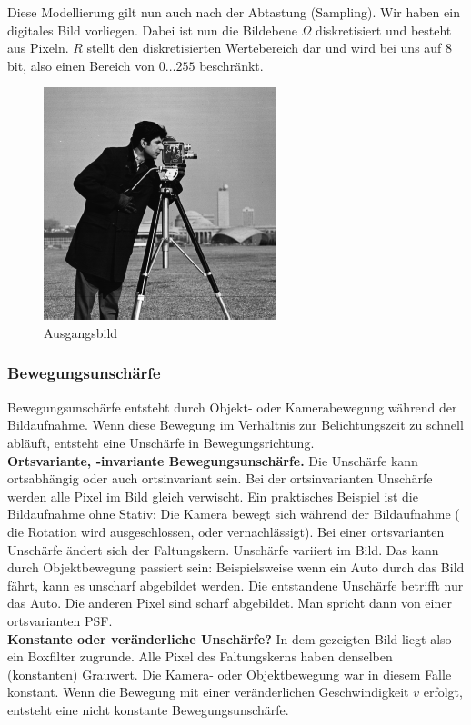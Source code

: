 \documentclass[a4paper,12pt]{article}
\begin{document}
Diese Modellierung gilt nun auch nach der Abtastung (Sampling). Wir haben
ein digitales Bild vorliegen. Dabei ist nun die Bildebene $\Omega$ diskretisiert und 
besteht aus Pixeln. $R$ stellt den diskretisierten Wertebereich dar 
und wird bei uns auf 8 bit, also einen Bereich von
$0\ldots255$ beschränkt. 

\begin{figure}[htbp]
\centering
\includegraphics[scale=0.8]{camera.png}
\caption{Ausgangsbild}
\label{figure_camera}
\end{figure}


\subsubsection{Bewegungsunschärfe} 
Bewegungsunschärfe entsteht durch Objekt- oder Kamerabewegung während der
Bildaufnahme. Wenn diese Bewegung im Verhältnis zur Belichtungszeit zu schnell
abläuft, entsteht eine Unschärfe in Bewegungsrichtung. \\
 \textbf{Ortsvariante, -invariante Bewegungsunschärfe.} Die Unschärfe
 kann ortsabhängig oder auch ortsinvariant sein. Bei der ortsinvarianten
 Unschärfe werden alle Pixel im Bild gleich verwischt.
 Ein praktisches Beispiel ist die Bildaufnahme ohne Stativ: Die Kamera
 bewegt sich während der Bildaufnahme ( die Rotation wird ausgeschlossen,
 oder vernachlässigt).
 Bei einer ortsvarianten Unschärfe ändert sich der Faltungskern. Unschärfe variiert im Bild. Das kann
 durch Objektbewegung passiert sein: Beispielsweise wenn ein Auto durch das Bild
 fährt, kann es unscharf abgebildet werden. Die entstandene Unschärfe betrifft
 nur das Auto. Die anderen Pixel sind scharf abgebildet. Man spricht dann von einer
 ortsvarianten PSF.\\
\textbf{Konstante oder veränderliche Unschärfe?} In dem gezeigten Bild liegt
also ein Boxfilter zugrunde. Alle Pixel des Faltungskerns haben denselben (konstanten)
Grauwert. Die Kamera- oder Objektbewegung war in diesem Falle konstant. Wenn die Bewegung mit
einer veränderlichen Geschwindigkeit $v$ erfolgt, entsteht eine nicht konstante
Bewegungsunschärfe.
\end{document}
